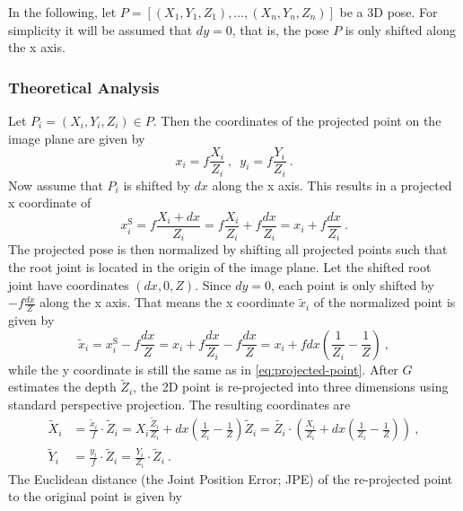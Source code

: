 In the following, let $P = [(X_1, Y_1, Z_1), \dotsc, (X_n, Y_n, Z_n)]$ be a 3D pose.
For simplicity it will be assumed that $dy = 0$, that is, the pose $P$ is only shifted along the x axis.

\subsubsection{Theoretical Analysis}
\label{sec:x-shift-error-theoretical}
Let $P_i = (X_i, Y_i, Z_i) \in P$.
Then the coordinates of the projected point on the image plane are given by
\begin{equation}
	\label{eq:projected-point}
	x_i = f \frac{X_i}{Z_i} \ ,\enspace y_i = f \frac{Y_i}{Z_i} \ .
\end{equation}
Now assume that $P_i$ is shifted by $dx$ along the x axis.
This results in a projected x coordinate of
\begin{equation}
	\label{eq:projected-x-y}
	x_i^\mathrm{S} = f \frac{X_i + dx}{Z_i} = f \frac{X_i}{Z_i} + f \frac{dx}{Z_i} = x_i + f \frac{dx}{Z_i}\ .
\end{equation}
The projected pose is then normalized by shifting all projected points such that the root joint is located in the origin of the image plane. 
Let the shifted root joint have coordinates $(dx, 0, Z)$.
Since $dy = 0$, each point is only shifted by $- f \frac{dx}{Z}$ along the x axis.
That means the x coordinate  $\widetilde{x}_i$ of the normalized point is given by
\begin{equation}
	\widetilde{x}_i
	= x_i^\mathrm{S} - f \frac{dx}{Z}
	= x_i + f \frac{dx}{Z_i} - f \frac{dx}{Z}
	= x_i + f dx (\frac{1}{Z_i} - \frac{1}{Z}) \ , 
\end{equation}
while the y coordinate is still the same as in \eqref{eq:projected-point}.
After $G$ estimates the depth $\widetilde{Z}_i$, the 2D point is re-projected into three dimensions using standard perspective projection. 
The resulting coordinates are 
\begin{align}
	\label{eq:re-projected-X}
	\widetilde{X}_i &= \frac{\widetilde{x}_i}{f} \cdot \widetilde{Z}_i
	= X_i \frac{\widetilde{Z}_i}{Z_i} + dx (\frac{1}{Z_i} - \frac{1}{Z}) \widetilde{Z}_i
	= \widetilde{Z_i} \cdot \left( \frac{X_i}{Z_i} + dx \left( \frac{1}{Z_i} - \frac{1}{Z} \right) \right) \ , \\
	\label{eq:re-projected-Y}
	\widetilde{Y}_i &= \frac{y_i}{f} \cdot \widetilde{Z}_i = \frac{Y_i}{Z_i} \cdot \widetilde{Z}_i \ .
\end{align}
The Euclidean distance (the Joint Position Error; JPE) of the re-projected point to the original point is given by

